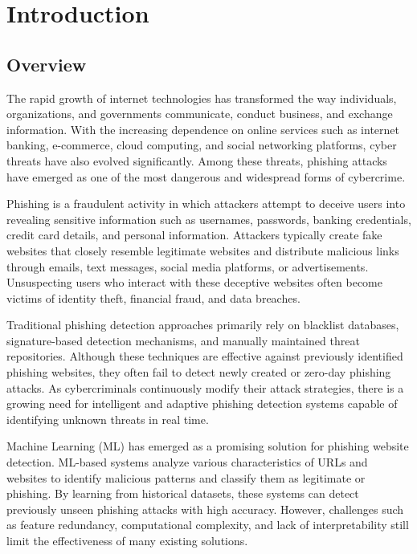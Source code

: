 \documentclass[12pt]{report}
\begin{document}

\chapter{Introduction}

\section{Overview}

The rapid growth of internet technologies has transformed the way individuals, organizations, and governments communicate, conduct business, and exchange information. With the increasing dependence on online services such as internet banking, e-commerce, cloud computing, and social networking platforms, cyber threats have also evolved significantly. Among these threats, phishing attacks have emerged as one of the most dangerous and widespread forms of cybercrime.

Phishing is a fraudulent activity in which attackers attempt to deceive users into revealing sensitive information such as usernames, passwords, banking credentials, credit card details, and personal information. Attackers typically create fake websites that closely resemble legitimate websites and distribute malicious links through emails, text messages, social media platforms, or advertisements. Unsuspecting users who interact with these deceptive websites often become victims of identity theft, financial fraud, and data breaches.

Traditional phishing detection approaches primarily rely on blacklist databases, signature-based detection mechanisms, and manually maintained threat repositories. Although these techniques are effective against previously identified phishing websites, they often fail to detect newly created or zero-day phishing attacks. As cybercriminals continuously modify their attack strategies, there is a growing need for intelligent and adaptive phishing detection systems capable of identifying unknown threats in real time.

Machine Learning (ML) has emerged as a promising solution for phishing website detection. ML-based systems analyze various characteristics of URLs and websites to identify malicious patterns and classify them as legitimate or phishing. By learning from historical datasets, these systems can detect previously unseen phishing attacks with high accuracy. However, challenges such as feature redundancy, computational complexity, and lack of interpretability still limit the effectiveness of many existing solutions.
\end{document}
